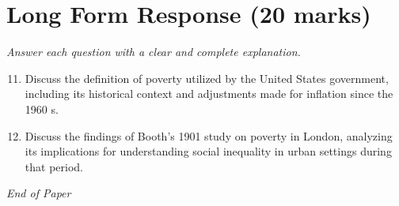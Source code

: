 \documentclass[12pt]{article}
\begin{document}
\section*{Long Form Response (20 marks)}
\textit{Answer each question with a clear and complete explanation.}
\begin{enumerate}[label=\arabic*.]
\setcounter{enumi}{10}
\item Discuss the definition of poverty utilized by the United States government, including its historical context and adjustments made for inflation since the 1960 s.
\item Discuss the findings of Booth's 1901 study on poverty in London, analyzing its implications for understanding social inequality in urban settings during that period.
\end{enumerate}

\vfill
\noindent\textit{End of Paper}
\end{document}
